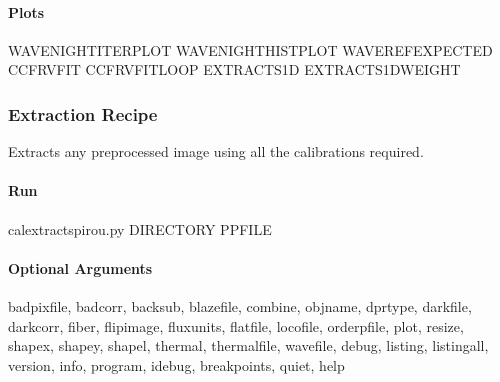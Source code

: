 \documentclass[a4paper,10pt,english]{report}
\begin{document}
\paragraph{Plots}
\label{\detokenize{user/spirou/recipes/wave_local:plots}}
\begin{sphinxVerbatim}[commandchars=\\\{\}]
WAVENIGHT\PYGZus{}ITERPLOT WAVENIGHT\PYGZus{}HISTPLOT WAVEREF\PYGZus{}EXPECTED
CCF\PYGZus{}RV\PYGZus{}FIT CCF\PYGZus{}RV\PYGZus{}FIT\PYGZus{}LOOP EXTRACT\PYGZus{}S1D EXTRACT\PYGZus{}S1D\PYGZus{}WEIGHT
\end{sphinxVerbatim}


\subsubsection{Extraction Recipe}
\label{\detokenize{user/spirou/recipes/extraction:extraction-recipe}}\label{\detokenize{user/spirou/recipes/extraction:recipes-spirou-extraction}}\label{\detokenize{user/spirou/recipes/extraction::doc}}
Extracts any preprocessed image using all the calibrations required.


\paragraph{Run}
\label{\detokenize{user/spirou/recipes/extraction:run}}
\begin{sphinxVerbatim}[commandchars=\\\{\}]
cal\PYGZus{}extract\PYGZus{}spirou.py \PYG{o}{[}DIRECTORY\PYG{o}{]} \PYG{o}{[}PP\PYGZus{}FILE\PYG{o}{]}
\end{sphinxVerbatim}


\paragraph{Optional Arguments}
\label{\detokenize{user/spirou/recipes/extraction:optional-arguments}}
\begin{sphinxVerbatim}[commandchars=\\\{\}]
\PYGZhy{}\PYGZhy{}badpixfile, \PYGZhy{}\PYGZhy{}badcorr, \PYGZhy{}\PYGZhy{}backsub, \PYGZhy{}\PYGZhy{}blazefile,
\PYGZhy{}\PYGZhy{}combine, \PYGZhy{}\PYGZhy{}objname, \PYGZhy{}\PYGZhy{}dprtype, \PYGZhy{}\PYGZhy{}darkfile, \PYGZhy{}\PYGZhy{}darkcorr,
\PYGZhy{}\PYGZhy{}fiber, \PYGZhy{}\PYGZhy{}flipimage, \PYGZhy{}\PYGZhy{}fluxunits, \PYGZhy{}\PYGZhy{}flatfile,
\PYGZhy{}\PYGZhy{}locofile, \PYGZhy{}\PYGZhy{}orderpfile, \PYGZhy{}\PYGZhy{}plot, \PYGZhy{}\PYGZhy{}resize,
\PYGZhy{}\PYGZhy{}shapex, \PYGZhy{}\PYGZhy{}shapey, \PYGZhy{}\PYGZhy{}shapel, \PYGZhy{}\PYGZhy{}thermal, \PYGZhy{}\PYGZhy{}thermalfile, \PYGZhy{}\PYGZhy{}wavefile,
\PYGZhy{}\PYGZhy{}debug, \PYGZhy{}\PYGZhy{}listing, \PYGZhy{}\PYGZhy{}listingall, \PYGZhy{}\PYGZhy{}version, \PYGZhy{}\PYGZhy{}info,
\PYGZhy{}\PYGZhy{}program, \PYGZhy{}\PYGZhy{}idebug, \PYGZhy{}\PYGZhy{}breakpoints, \PYGZhy{}\PYGZhy{}quiet, \PYGZhy{}\PYGZhy{}help
\end{sphinxVerbatim}
\end{document}
